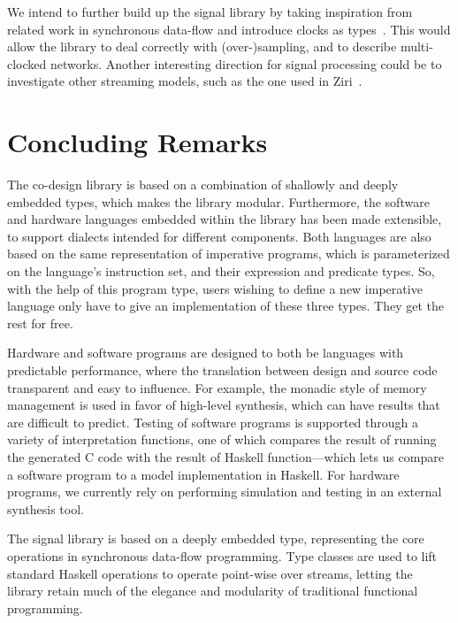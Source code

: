 We intend to further build up the signal library by taking inspiration from related work in synchronous data-flow and introduce clocks as types~\cite{lucy2008}. This would allow the library to deal correctly with (over-)sampling, and to describe multi-clocked networks. Another interesting direction for signal processing could be to investigate other streaming models, such as the one used in Ziri~\cite{ziria2015, fudgets1993}.

\section{Concluding Remarks}
\label{conc}

The co-design library is based on a combination of shallowly and deeply embedded types, which makes the library modular. Furthermore, the software and hardware languages embedded within the library has been made extensible, to support dialects intended for different components. Both languages are also based on the same representation of imperative programs, which is parameterized on the language's instruction set, and their expression and predicate types. So, with the help of this program type, users wishing to define a new imperative language only have to give an implementation of these three types. They get the rest for free.

Hardware and software programs are designed to both be languages with predictable performance, where the translation between design and source code transparent and easy to influence. For example, the monadic style of memory management is used in favor of high-level synthesis, which can have results that are difficult to predict. Testing of software programs is supported through a variety of interpretation functions, one of which compares the result of running the generated C code with the result of Haskell function---which lets us compare a software program to a model implementation in Haskell. For hardware programs, we currently rely on performing simulation and testing in an external synthesis tool.

The signal library is based on a deeply embedded type, representing the core operations in synchronous data-flow programming. Type classes are used to lift standard Haskell operations to operate point-wise over streams, letting the library retain much of the elegance and modularity of traditional functional programming.
